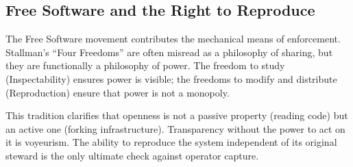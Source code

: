 \subsection{Free Software and the Right to Reproduce}

The Free Software movement \citep{stallman2002} contributes the mechanical means of enforcement. Stallman's ``Four Freedoms'' are often misread as a philosophy of sharing, but they are functionally a philosophy of power. The freedom to study (Inspectability) ensures power is visible; the freedoms to modify and distribute (Reproduction) ensure that power is not a monopoly.

This tradition clarifies that openness is not a passive property (reading code) but an active one (forking infrastructure). Transparency without the power to act on it is voyeurism. The ability to reproduce the system independent of its original steward is the only ultimate check against operator capture.